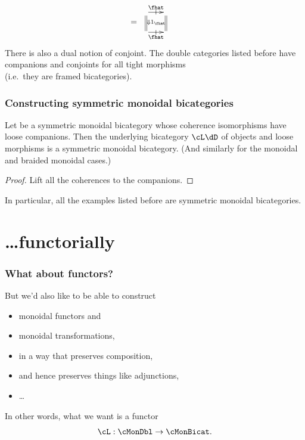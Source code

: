 \documentclass{beamer}
\begin{document}
\begin{frame}
\begin{align}
\begin{array}{c}
    \end{array} &=
    \begin{array}{c}
      \xymatrix@-.5pc{
        \ar[r]|-@{|}^-{\fhat} \ar@{=}[d] \ar@{}[dr]|{\Downarrow 1_{\fhat}}
        & \ar@{=}[d]\\
        \ar[r]|-@{|}_-{\fhat} & }
    \end{array}
  \end{align}
  There is also a dual notion of \alert{conjoint}.
  The double categories listed before have companions and conjoints for all tight morphisms\\ (i.e.\ they are \alert{framed bicategories}).
\end{frame}

\begin{frame}
  \frametitle{Constructing symmetric monoidal bicategories}
  \begin{theorem}[S., 2010]
    Let \dD be a symmetric monoidal bicategory whose coherence isomorphisms have loose companions.
    Then the underlying bicategory $\cL\dD$ of objects and loose morphisms is a symmetric monoidal bicategory.
    (And similarly for the monoidal and braided monoidal cases.)
  \end{theorem}
  \begin{proof}
    Lift all the coherences to the companions.
  \end{proof}
  In particular, all the examples listed before are symmetric monoidal bicategories.
\end{frame}

\section{\dots functorially}

\begin{frame}
  \frametitle{What about functors?}
  But we'd also like to be able to construct
  \begin{itemize}
  \item monoidal functors and
  \item monoidal transformations, 
  \item in a way that preserves composition,
  \item and hence preserves things like adjunctions,
  \item \dots
  \end{itemize}
  In other words, what we want is a \alert{functor}
  \[\cL : \cMonDbl \to \cMonBicat .\]
\end{frame}
\end{document}
